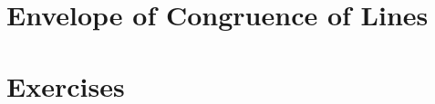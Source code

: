 \section{Envelope of Congruence of Lines}
\label{app:B-envelope}
 

\label{app:B-tri-ctrs}
%

\label{app:Bderived}
%

\section{Exercises}
\label{app:C-exercises}
 
